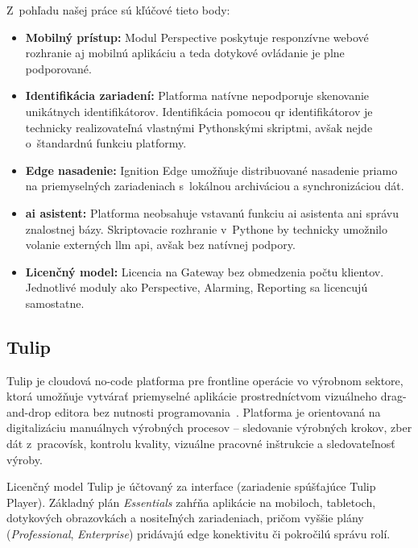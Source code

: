 Z~pohľadu našej práce sú kľúčové tieto body:

\begin{itemize}
      \item \textbf{Mobilný prístup:} Modul Perspective poskytuje responzívne
            webové rozhranie aj mobilnú aplikáciu a teda dotykové ovládanie
            je plne podporované.
      \item \textbf{Identifikácia zariadení:} Platforma natívne nepodporuje
            skenovanie unikátnych identifikátorov. Identifikácia pomocou \acrshort{qr} identifikátorov je
            technicky realizovateľná vlastnými Pythonskými skriptmi, avšak
            nejde o~štandardnú funkciu platformy.
      \item \textbf{Edge nasadenie:} Ignition Edge umožňuje distribuované
            nasadenie priamo na priemyselných zariadeniach s~lokálnou
            archiváciou a synchronizáciou dát.
      \item \textbf{\acrshort{ai} asistent:} Platforma neobsahuje vstavanú funkciu
            \acrshort{ai} asistenta ani správu znalostnej bázy. Skriptovacie
            rozhranie v~Pythone by technicky umožnilo volanie externých
            \acrshort{llm} \acrshort{api}, avšak bez natívnej podpory.
      \item \textbf{Licenčný model:} Licencia na Gateway bez obmedzenia
            počtu klientov. Jednotlivé moduly ako Perspective, Alarming,
            Reporting sa licencujú samostatne.
\end{itemize}

\subsection{Tulip}

Tulip je cloudová no-code platforma pre frontline operácie vo výrobnom sektore,
ktorá umožňuje vytvárať priemyselné aplikácie prostredníctvom vizuálneho
drag-and-drop editora bez nutnosti programovania~\cite{t04}. Platforma je
orientovaná na digitalizáciu manuálnych výrobných procesov -- sledovanie
výrobných krokov, zber dát z~pracovísk, kontrolu kvality, vizuálne pracovné
inštrukcie a sledovateľnosť výroby.

Licenčný model Tulip je účtovaný za interface (zariadenie spúšťajúce Tulip
Player). Základný plán \textit{Essentials} zahŕňa aplikácie na mobiloch,
tabletoch, dotykových obrazovkách a nositeľných zariadeniach, pričom vyššie
plány (\textit{Professional}, \textit{Enterprise}) pridávajú edge konektivitu
či pokročilú správu rolí.

